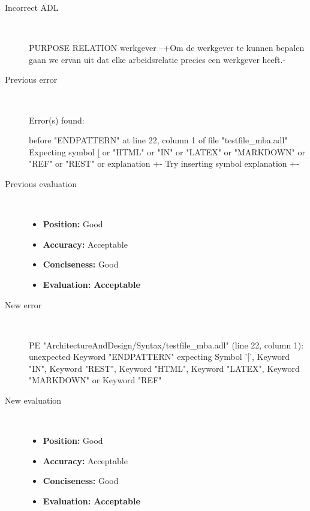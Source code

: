 \begin{description}
  \item[Incorrect ADL]~\\
\begin{adl}
PURPOSE RELATION werkgever
--{+Om de werkgever te kunnen bepalen gaan we ervan uit dat elke arbeidsrelatie precies een werkgever heeft.-}\end{adl}
  \item[Previous error]~\\
\begin{haskell}
Error(s) found:

before "ENDPATTERN" at line 22, column 1 of file "testfile_mba.adl"
Expecting symbol [ or "HTML" or "IN" or "LATEX" or "MARKDOWN" or "REF" or "REST"
 or explanation {+-}
Try inserting symbol explanation {+-}
\end{haskell}
  \item[Previous evaluation]~\\
    \begin{itemize}
    \item \textbf{Position:} Good
    \item \textbf{Accuracy:} Acceptable
    \item \textbf{Conciseness:} Good
    \item \textbf{Evaluation: Acceptable}
    \end{itemize}
  \item[New error]~\\
\begin{haskell}
PE "ArchitectureAndDesign/Syntax/testfile_mba.adl" (line 22, column 1):
unexpected Keyword "ENDPATTERN"
expecting Symbol '[', Keyword "IN", Keyword "REST", Keyword "HTML", Keyword "LATEX", Keyword "MARKDOWN" or Keyword "REF"\end{haskell}
  \item[New evaluation]~\\
    \begin{itemize}
    \item \textbf{Position:} Good
    \item \textbf{Accuracy:} Acceptable
    \item \textbf{Conciseness:} Good
    \item \textbf{Evaluation: Acceptable}
    \end{itemize}
  \end{description}

\hrulefill


